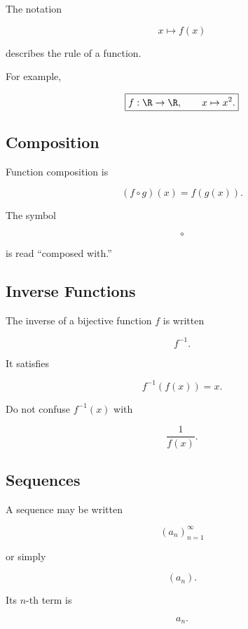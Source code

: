 The notation

\[
\boxed{
x\mapsto f(x)
}
\]

describes the rule of a function.

For example,

\[
\boxed{
f:\R\to\R,
\qquad
x\mapsto x^2.
}
\]

\subsection{Composition}
\label{subsec:function-composition-reference}

Function composition is

\[
\boxed{
(f\circ g)(x)
=
f(g(x)).
}
\]

The symbol

\[
\circ
\]

is read ``composed with.''

\subsection{Inverse Functions}
\label{subsec:inverse-function-notation-reference}

The inverse of a bijective function \(f\) is written

\[
\boxed{
f^{-1}.
}
\]

It satisfies

\[
\boxed{
f^{-1}(f(x))
=
x.
}
\]

Do not confuse \(f^{-1}(x)\) with

\[
\frac{1}{f(x)}.
\]

\subsection{Sequences}
\label{subsec:sequence-notation-reference}

A sequence may be written

\[
\boxed{
(a_n)_{n=1}^{\infty}
}
\]

or simply

\[
\boxed{
(a_n).
}
\]

Its \(n\)-th term is

\[
\boxed{
a_n.
}
\]

